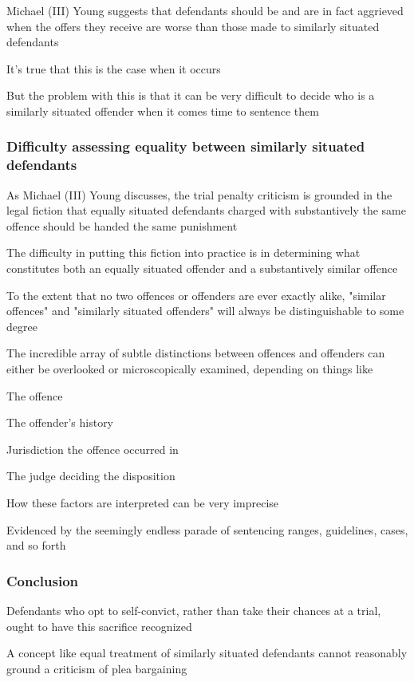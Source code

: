 Michael (III) Young suggests that defendants should be and are in fact aggrieved when the offers they receive are worse than those made to similarly situated defendants

It's true that this is the case when it occurs

But the problem with this is that it can be very difficult to decide who is a similarly situated offender when it comes time to sentence them

\subsubsection{Difficulty assessing equality between similarly situated defendants}

As Michael (III) Young discusses, the trial penalty criticism is grounded in the legal fiction that equally situated defendants charged with substantively the same offence should be handed the same punishment

The difficulty in putting this fiction into practice is in determining what constitutes both an equally situated offender and a substantively similar offence

To the extent that no two offences or offenders are ever exactly alike, "similar offences" and "similarly  situated offenders" will always be distinguishable to some degree

The incredible array of subtle distinctions between offences and offenders can either be overlooked or microscopically examined, depending on things like

The offence

The offender's history

Jurisdiction the offence occurred in

The judge deciding the disposition

How these factors are interpreted can be very imprecise

Evidenced by the seemingly endless parade of sentencing ranges, guidelines, cases, and so forth

\subsubsection{Conclusion}

Defendants who opt to self-convict, rather than take their chances at a trial, ought to have this sacrifice recognized

A concept like equal treatment of similarly situated defendants cannot reasonably ground a criticism of plea bargaining